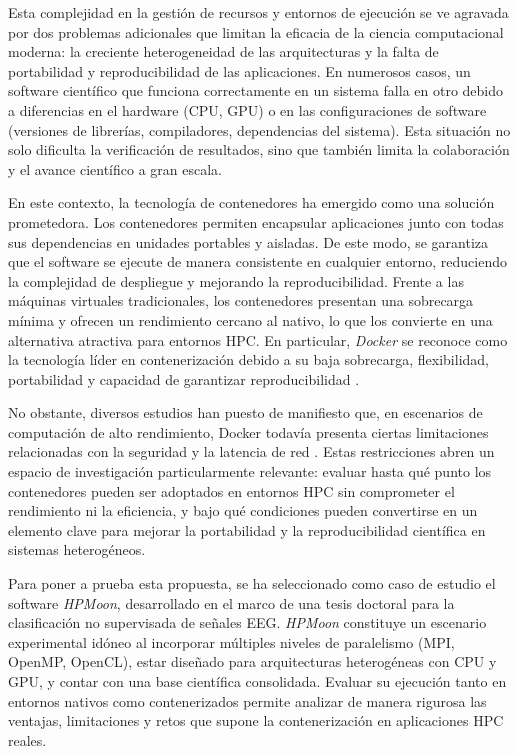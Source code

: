 Esta complejidad en la gestión de recursos y entornos de ejecución se ve agravada por dos problemas adicionales que limitan la eficacia de la ciencia computacional moderna: la creciente heterogeneidad de las arquitecturas y la falta de portabilidad y reproducibilidad de las aplicaciones. En numerosos casos, un software científico que funciona correctamente en un sistema falla en otro debido a diferencias en el hardware (CPU, GPU) o en las configuraciones de software (versiones de librerías, compiladores, dependencias del sistema). Esta situación no solo dificulta la verificación de resultados, sino que también limita la colaboración y el avance científico a gran escala.

En este contexto, la tecnología de contenedores ha emergido como una solución prometedora. Los contenedores permiten encapsular aplicaciones junto con todas sus dependencias en unidades portables y aisladas. De este modo, se garantiza que el software se ejecute de manera consistente en cualquier entorno, reduciendo la complejidad de despliegue y mejorando la reproducibilidad. Frente a las máquinas virtuales tradicionales, los contenedores presentan una sobrecarga mínima y ofrecen un rendimiento cercano al nativo, lo que los convierte en una alternativa atractiva para entornos HPC. En particular, \textit{Docker} se reconoce como la tecnología líder en contenerización debido a su baja sobrecarga, flexibilidad, portabilidad y capacidad de garantizar reproducibilidad \cite{saha2016evaluation}.

No obstante, diversos estudios han puesto de manifiesto que, en escenarios de computación de alto rendimiento, Docker todavía presenta ciertas limitaciones relacionadas con la seguridad y la latencia de red \cite{Alles2018AssessingTC, MedranoJaimes2018UseOC}. Estas restricciones abren un espacio de investigación particularmente relevante: evaluar hasta qué punto los contenedores pueden ser adoptados en entornos HPC sin comprometer el rendimiento ni la eficiencia, y bajo qué condiciones pueden convertirse en un elemento clave para mejorar la portabilidad y la reproducibilidad científica en sistemas heterogéneos.

Para poner a prueba esta propuesta, se ha seleccionado como caso de estudio el software \textit{HPMoon}, desarrollado en el marco de una tesis doctoral para la clasificación no supervisada de señales EEG. \textit{HPMoon} constituye un escenario experimental idóneo al incorporar múltiples niveles de paralelismo (MPI, OpenMP, OpenCL), estar diseñado para arquitecturas heterogéneas con CPU y GPU, y contar con una base científica consolidada. Evaluar su ejecución tanto en entornos nativos como contenerizados permite analizar de manera rigurosa las ventajas, limitaciones y retos que supone la contenerización en aplicaciones HPC reales.

